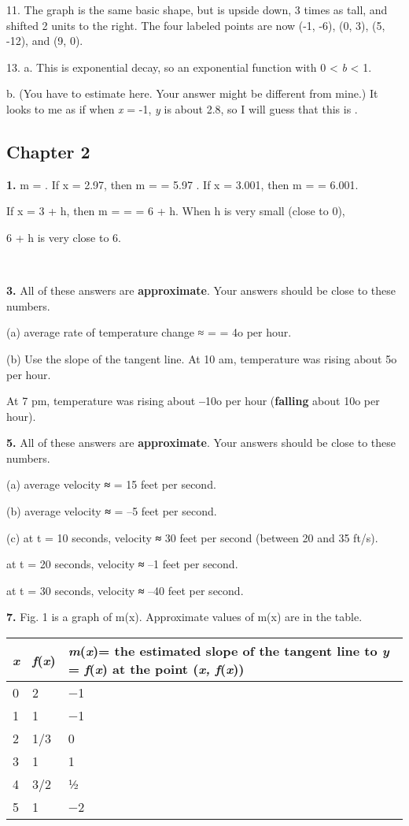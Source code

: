 11. The graph is the same basic shape, but is upside down, 3 times as
tall, and shifted 2 units to the right. The four labeled points are now
(-1, -6), (0, 3), (5, -12), and (9, 0).

13. a. This is exponential decay, so an exponential function with 0
\textless{} \emph{b} \textless{} 1.

b. (You have to estimate here. Your answer might be different from
mine.) It looks to me as if when \emph{x} = -1, \emph{y} is about 2.8,
so I will guess that this is .

\hypertarget{chapter-2}{\subsection{Chapter 2}\label{chapter-2}}

\textbf{1.} m = . If x = 2.97, then m = = 5.97 . If x = 3.001, then m =
= 6.001.

If x = 3 + h, then m = = = 6 + h. When h is very small (close to 0),

6 + h is very close to 6.

\textbf{\\
}

\textbf{3.} All of these answers are \textbf{approximate}. Your answers
should be close to these numbers.

(a) average rate of temperature change ≈ = = 4o per hour.

(b) Use the slope of the tangent line. At 10 am, temperature was rising
about 5o per hour.

At 7 pm, temperature was rising about \textbf{--}10o per hour
(\textbf{falling} about 10o per hour).

\textbf{5.} All of these answers are \textbf{approximate}. Your answers
should be close to these numbers.

(a) average velocity \textbf{≈} = 15 feet per second.

(b) average velocity \textbf{≈} = --5 feet per second.

(c) at t = 10 seconds, velocity \textbf{≈} 30 feet per second (between
20 and 35 ft/s).

at t = 20 seconds, velocity \textbf{≈} --1 feet per second.

at t = 30 seconds, velocity \textbf{≈} --40 feet per second.

\textbf{7.} Fig. 1 is a graph of m(x). Approximate values of m(x) are in
the table.

\begin{longtable}[]{@{}lll@{}}
\toprule
\emph{x} & \emph{f}(\emph{x}) & \emph{m}(\emph{x})= the estimated slope
of the tangent line to \emph{y} = \emph{f}(\emph{x}) at the point
(\emph{x, f}(\emph{x}))\tabularnewline
\midrule
\endhead
0 & 2 & −1\tabularnewline
1 & 1 & −1\tabularnewline
2 & 1/3 & 0\tabularnewline
3 & 1 & 1\tabularnewline
4 & 3/2 & ½\tabularnewline
5 & 1 & −2\tabularnewline
\bottomrule
\end{longtable}

